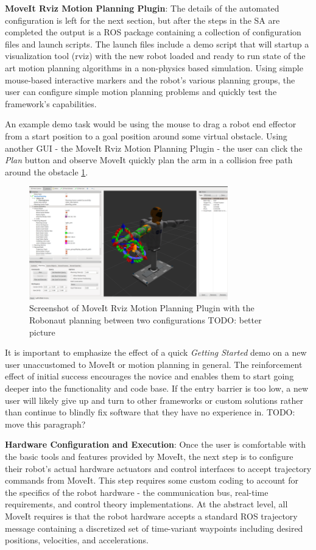 \documentclass[10pt,journal,compsoc]{joser1}
\begin{document}
{{\bf MoveIt Rviz Motion Planning Plugin}: The details of the automated configuration is left for the next section, but after the steps in the SA are completed the output is a ROS package containing a collection of configuration files and launch scripts. The launch files include a demo script that will startup a visualization tool (rviz) with the new robot loaded and ready to run state of the art motion planning algorithms in a non-physics based simulation. Using simple mouse-based interactive markers and the robot's various planning groups, the user can configure simple motion planning problems and quickly test the framework's capabilities.  

An example demo task would be using the mouse to drag a robot end effector from a start position to a goal position around some virtual obstacle. Using another GUI - the MoveIt Rviz Motion Planning Plugin - the user can click the \textit{Plan} button and observe MoveIt quickly plan the arm in a collision free path around the obstacle \ref{fig:motionrvizplugin}.

\begin{figure}[!t]
\centering
\includegraphics[width=3.4in]{images/rviz_plugin}
\caption{Screenshot of MoveIt Rviz Motion Planning Plugin with the Robonaut planning between two configurations TODO: better picture}
\label{fig:motionrvizplugin}
\end{figure}

It is important to emphasize the effect of a quick \textit{Getting Started} demo on a new user unaccustomed to MoveIt or motion planning in general. The reinforcement effect of initial success encourages the novice and enables them to start going deeper into the functionality and code base. If the entry barrier is too low, a new user will likely give up and turn to other frameworks or custom solutions rather than continue to blindly fix software that they have no experience in. TODO: move this paragraph?

{\bf Hardware Configuration and Execution}: Once the user is comfortable with the basic tools and features provided by MoveIt, the next step is to configure their robot's actual hardware actuators and control interfaces to accept trajectory commands from MoveIt. This step requires some custom coding to account for the specifics of the robot hardware - the communication bus, real-time requirements, and control theory implementations. At the abstract level, all MoveIt requires is that the robot hardware accepts a standard ROS trajectory message containing a discretized set of time-variant waypoints including desired positions, velocities, and accelerations. 

}
\end{document}
